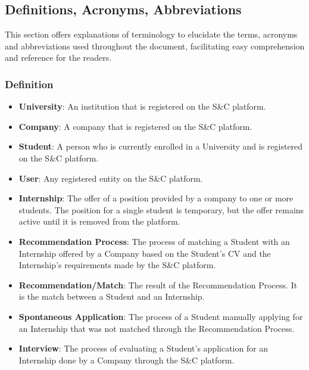 \subsection{Definitions, Acronyms, Abbreviations}  
This section offers explanations of terminology to elucidate the terms, acronyms and abbreviations used throughout the document, facilitating easy comprehension and reference for the readers.
\subsubsection{Definition}
\begin{itemize}
    \item \textcolor{titleColor}{\textbf{University}\label{def:university}}: An institution that is registered on the S\&C platform.
    \item \textcolor{titleColor}{\textbf{Company}\label{def:company}}: A company that is registered on the S\&C platform.
    \item \textcolor{titleColor}{\textbf{Student}\label{def:student}}: A person who is currently enrolled in a University and is registered on the S\&C platform.
    \item \textcolor{titleColor}{\textbf{User}\label{def:user}}: Any registered entity on the S\&C platform.
    \item \textcolor{titleColor}{\textbf{Internship}\label{def:internship}}: The offer of a position provided by a company to one or more students. The position for a single student is temporary, but the offer remains active until it is removed from the platform.
    \item \textcolor{titleColor}{\textbf{Recommendation Process}}\label{def:recommendationProcess}: The process of matching a Student with an Internship offered by a Company based on the Student's CV and the Internship's requirements made by the S\&C platform.
    \item \textcolor{titleColor}{\textbf{Recommendation/Match}\label{def:match}}: The result of the Recommendation Process. It is the match between a Student and an Internship.
    \item \textcolor{titleColor}{\textbf{Spontaneous Application}\label{def:spontaneousApplication}}: The process of a Student manually applying for an Internship that was not matched through the Recommendation Process.
    \item \textcolor{titleColor}{\textbf{Interview}\label{def:Interview}}: The process of evaluating a Student's application for an Internship done by a Company through the S\&C platform. 

\end{itemize}
